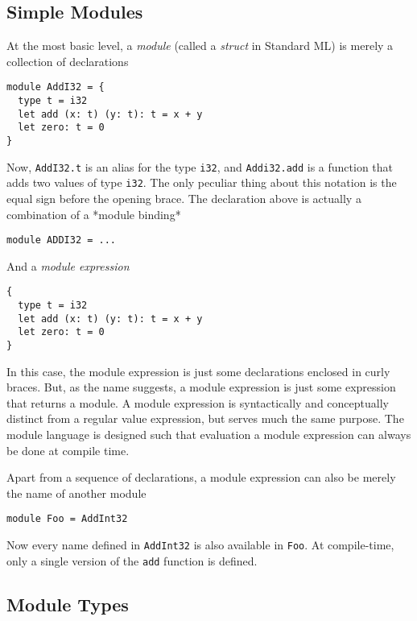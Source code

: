 \documentclass[oneside,11pt]{book}
\begin{document}
\subsection{Simple Modules}

At the most basic level, a \textit{module} (called a \textit{struct}
in Standard ML) is merely a collection of declarations

\begin{lstlisting}
module AddI32 = {
  type t = i32
  let add (x: t) (y: t): t = x + y
  let zero: t = 0
}
\end{lstlisting}

Now, \texttt{AddI32.t} is an alias for the type \texttt{i32}, and
\texttt{Addi32.add} is a function that adds two values of type
\texttt{i32}.  The only peculiar thing about this notation is the
equal sign before the opening brace.  The declaration above is
actually a combination of a *module binding*

\begin{lstlisting}
module ADDI32 = ...
\end{lstlisting}

And a \textit{module expression}

\begin{lstlisting}
{
  type t = i32
  let add (x: t) (y: t): t = x + y
  let zero: t = 0
}
\end{lstlisting}

In this case, the module expression is just some declarations enclosed
in curly braces.  But, as the name suggests, a module expression is
just some expression that returns a module.  A module expression is
syntactically and conceptually distinct from a regular value
expression, but serves much the same purpose.  The module language is
designed such that evaluation a module expression can always be done
at compile time.

Apart from a sequence of declarations, a module expression can also be
merely the name of another module

\begin{lstlisting}
module Foo = AddInt32
\end{lstlisting}

Now every name defined in \texttt{AddInt32} is also available in
\texttt{Foo}.  At compile-time, only a single version of the
\texttt{add} function is defined.

\subsection{Module Types}
\end{document}
